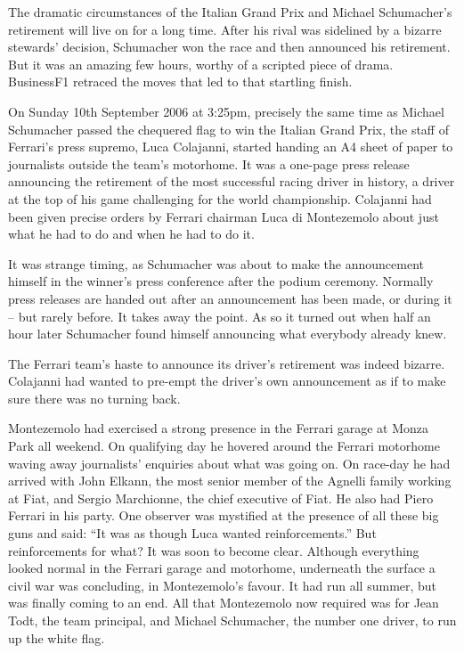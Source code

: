 \documentclass{article}
\begin{document}
\noindent The dramatic circumstances of the Italian Grand Prix and Michael Schumacher’s retirement will live on for a long time. After his rival was sidelined by a bizarre stewards’ decision, Schumacher won the race and then announced his retirement. But it was an amazing few hours, worthy of a scripted piece of drama. BusinessF1 retraced the moves that led to that startling finish.

On Sunday 10th September 2006 at 3:25pm, precisely the same time as Michael Schumacher passed the chequered flag to win the Italian Grand Prix, the staff of Ferrari’s press supremo, Luca Colajanni, started handing an A4 sheet of paper to journalists outside the team’s motorhome. It was a one-page press release announcing the retirement of the most successful racing driver in history, a driver at the top of his game challenging for the world championship. Colajanni had been given precise orders by Ferrari chairman Luca di Montezemolo about just what he had to do and when he had to do it.

It was strange timing, as Schumacher was about to make the announcement himself in the winner’s press conference after the podium ceremony. Normally press releases are handed out after an announcement has been made, or during it – but rarely before. It takes away the point. As so it turned out when half an hour later Schumacher found himself announcing what everybody already knew.

The Ferrari team’s haste to announce its driver’s retirement was indeed bizarre. Colajanni had wanted to pre-empt the driver’s own announcement as if to make sure there was no turning back.

Montezemolo had exercised a strong presence in the Ferrari garage at Monza Park all weekend. On qualifying day he hovered around the Ferrari motorhome waving away journalists’ enquiries about what was going on. On race-day he had arrived with John Elkann, the most senior member of the Agnelli family working at Fiat, and Sergio Marchionne, the chief executive of Fiat. He also had Piero Ferrari in his party. One observer was mystified at the presence of all these big guns and said: “It was as though Luca wanted reinforcements.” But reinforcements for what? It was soon to become clear. Although everything looked normal in the Ferrari garage and motorhome, underneath the surface a civil war was concluding, in Montezemolo’s favour. It had run all summer, but was finally coming to an end. All that Montezemolo now required was for Jean Todt, the team principal, and Michael Schumacher, the number one driver, to run up the white flag.
\end{document}
